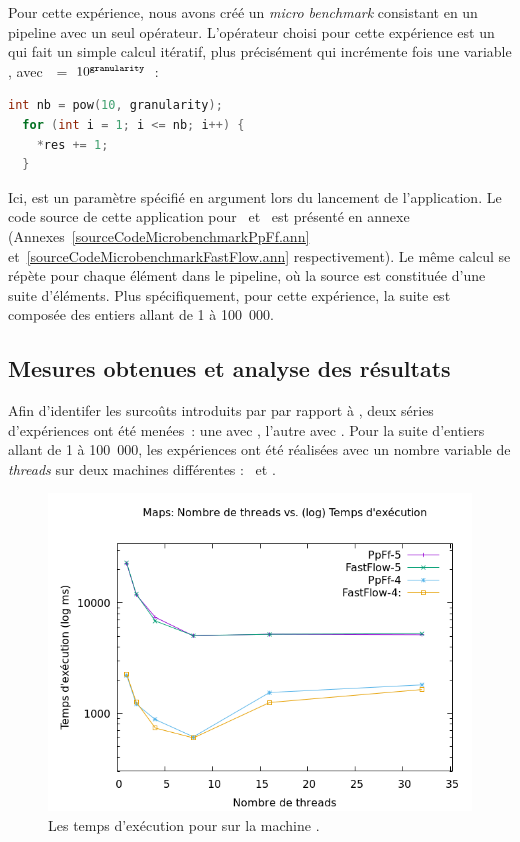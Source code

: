 Pour cette exp\'erience, nous avons cr\'e\'e un \emph{micro benchmark} consistant en un {pipeline} avec un seul op\'erateur. L'op\'erateur choisi pour cette exp\'erience est un  qui fait un simple calcul it\'eratif, plus pr\'ecis\'ement qui incr\'emente   fois une variable , avec~~=~$10^{{\tt granularity}}$~:
{
\begin{lstlisting}[language=c++]
  int nb = pow(10, granularity);
  for (int i = 1; i <= nb; i++) {
    *res += 1;   
  }
\end{lstlisting}
} 

Ici,  est un param\`etre sp\'ecifi\'e en argument lors du lancement de l'application. Le code source de cette application pour~ et~ est pr\'esent\'e en annexe (Annexes~\ref{sourceCodeMicrobenchmarkPpFf.ann} et~\ref{sourceCodeMicrobenchmarkFastFlow.ann} respectivement). Le m\^eme calcul se r\'ep\`ete pour chaque \'el\'ement dans le pipeline, o\`u la source est constitu\'ee d'une suite d'\'el\'ements. Plus sp\'ecifiquement, pour cette exp\'erience, la suite est compos\'ee des entiers allant de 1 \`a 100~000.  


\subsection{Mesures obtenues et analyse des r\'esultats}

Afin d'identifer les surco\^uts introduits par \PpFf{} par rapport \`a , deux s\'eries d'exp\'eriences ont \'et\'e men\'ees~: une avec , l'autre avec . Pour la suite d'entiers allant de 1 \`a 100~000, les exp\'eriences ont \'et\'e r\'ealis\'ees avec un nombre variable de \emph{threads} sur deux machines diff\'erentes : \ et .  


\begin{figure}
\centering
     \includegraphics[width=1.0\textwidth]{Figures/graphe_temps_Java_Maps.png}
      \caption{Les temps d'ex\'ecution pour  sur la machine .}
       \label{GrapheTempsMapsJava.fig}
\end{figure}

